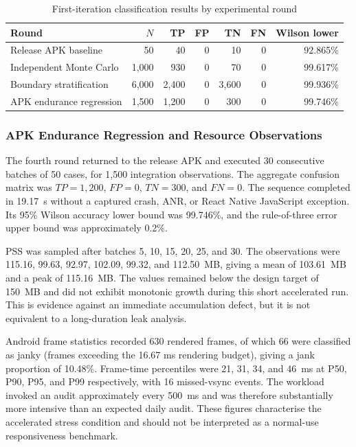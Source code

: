\begin{table}[H]
\centering
\caption{First-iteration classification results by experimental round}
\label{tab:ch5-first-iteration}
\small
\begin{tabular}{lrrrrrr}
\toprule
\textbf{Round} & \textbf{\(N\)} & \textbf{TP} & \textbf{FP} & \textbf{TN} & \textbf{FN} & \textbf{Wilson lower} \\
\midrule
Release APK baseline & 50 & 40 & 0 & 10 & 0 & 92.865\% \\
Independent Monte Carlo & 1,000 & 930 & 0 & 70 & 0 & 99.617\% \\
Boundary stratification & 6,000 & 2,400 & 0 & 3,600 & 0 & 99.936\% \\
APK endurance regression & 1,500 & 1,200 & 0 & 300 & 0 & 99.746\% \\
\bottomrule
\end{tabular}
\end{table}

\subsubsection{APK Endurance Regression and Resource Observations}

The fourth round returned to the release APK and executed 30 consecutive batches of 50 cases, for 1,500 integration observations. The aggregate confusion matrix was \(TP=1,200\), \(FP=0\), \(TN=300\), and \(FN=0\). The sequence completed in 19.17~s without a captured crash, ANR, or React Native JavaScript exception. Its 95\% Wilson accuracy lower bound was 99.746\%, and the rule-of-three error upper bound was approximately 0.2\%.

PSS was sampled after batches 5, 10, 15, 20, 25, and 30. The observations were 115.16, 99.63, 92.97, 102.09, 99.32, and 112.50~MB, giving a mean of 103.61~MB and a peak of 115.16~MB. The values remained below the design target of 150~MB and did not exhibit monotonic growth during this short accelerated run. This is evidence against an immediate accumulation defect, but it is not equivalent to a long-duration leak analysis.

Android frame statistics recorded 630 rendered frames, of which 66 were classified as janky (frames exceeding the 16.67 ms rendering budget), giving a jank proportion of 10.48\%. Frame-time percentiles were 21, 31, 34, and 46~ms at P50, P90, P95, and P99 respectively, with 16 missed-vsync events. The workload invoked an audit approximately every 500~ms and was therefore substantially more intensive than an expected daily audit. These figures characterise the accelerated stress condition and should not be interpreted as a normal-use responsiveness benchmark.

